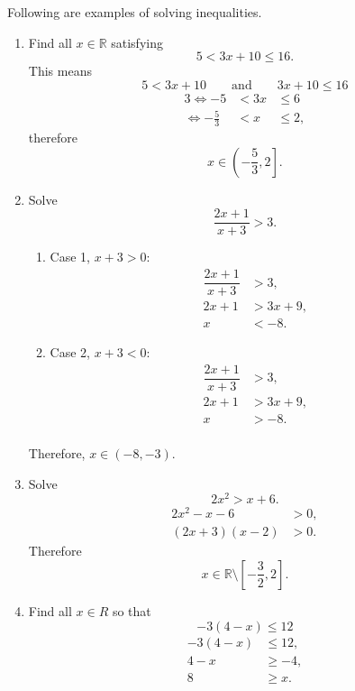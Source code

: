 \begin{example}
    Following are examples of solving inequalities.
    \begin{enumerate}
        \item Find all $x\in\mathbb R$ satisfying \[5<3x+10\leq16.\]
        This means
        \[5<3x+10\qquad\text{and}\qquad 3x+10\leq16\]
        \begin{alignat*}{3}
            \iff-5&<3x&\leq6\\
            \iff-\frac53&<x&\leq2,
        \end{alignat*}
        therefore
        \[x\in\left(-\frac53,2\right].\]
        
        \item Solve \[\dfrac{2x+1}{x+3}>3.\]
        \begin{enumerate}
            \item Case 1, $x+3>0$:
            \begin{align*}
                \dfrac{2x+1}{x+3}&>3,\\
                2x+1&>3x+9,\\
                x&<-8.
            \end{align*}
            \item Case 2, $x+3<0$:
            \begin{align*}
                \dfrac{2x+1}{x+3}&>3,\\
                2x+1&>3x+9,\\
                x&>-8.\\
            \end{align*}
        \end{enumerate}
        Therefore, $x\in(-8,-3)$.
        
        \item Solve \[2x^2>x+6.\]
        \begin{align*}
            2x^2-x-6&>0,\\
            (2x+3)(x-2)&>0.
        \end{align*}
        Therefore
        \[x\in\mathbb R\setminus\left[-\frac32,2\right].\]
        
        \item Find all $x\in R$ so that \[-3(4-x)\leq12\]
        \begin{align*}
            -3(4-x)&\leq12,\\
            4-x&\geq-4,\\
            8&\geq x.
        \end{align*}
        

\end{enumerate}
\end{example}

